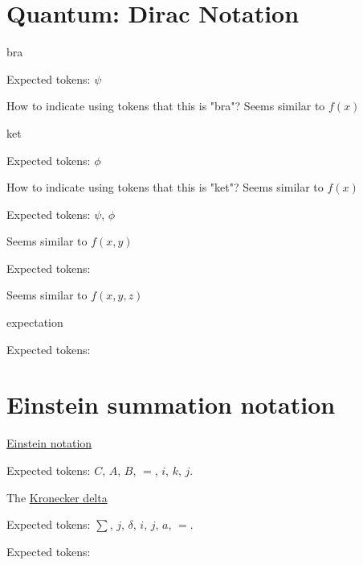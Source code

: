\documentclass{article}
\begin{document}
\section{Quantum: Dirac Notation}

bra

Expected tokens: $\psi$

How to indicate using tokens that this is "bra"? Seems similar to $f(x)$

\hrulefill


ket

Expected tokens: $\phi$

How to indicate using tokens that this is "ket"? Seems similar to $f(x)$

\hrulefill



Expected tokens: $\psi$, $\phi$

Seems similar to $f(x, y)$

\hrulefill



Expected tokens: 

Seems similar to $f(x, y, z)$

\hrulefill


expectation

Expected tokens: 

\hrulefill


\section{Einstein summation notation}


\href{https://en.wikipedia.org/wiki/Einstein_notation}{Einstein notation}


Expected tokens: $C$, $A$, $B$, $=$, $i$, $k$, $j$.

\hrulefill


The \href{https://en.wikipedia.org/wiki/Kronecker_delta}{Kronecker delta}

Expected tokens: $\sum$, $j$, $\delta$, $i$, $j$, $a$, $=$.

\hrulefill




Expected tokens: 

\hrulefill
\end{document}
